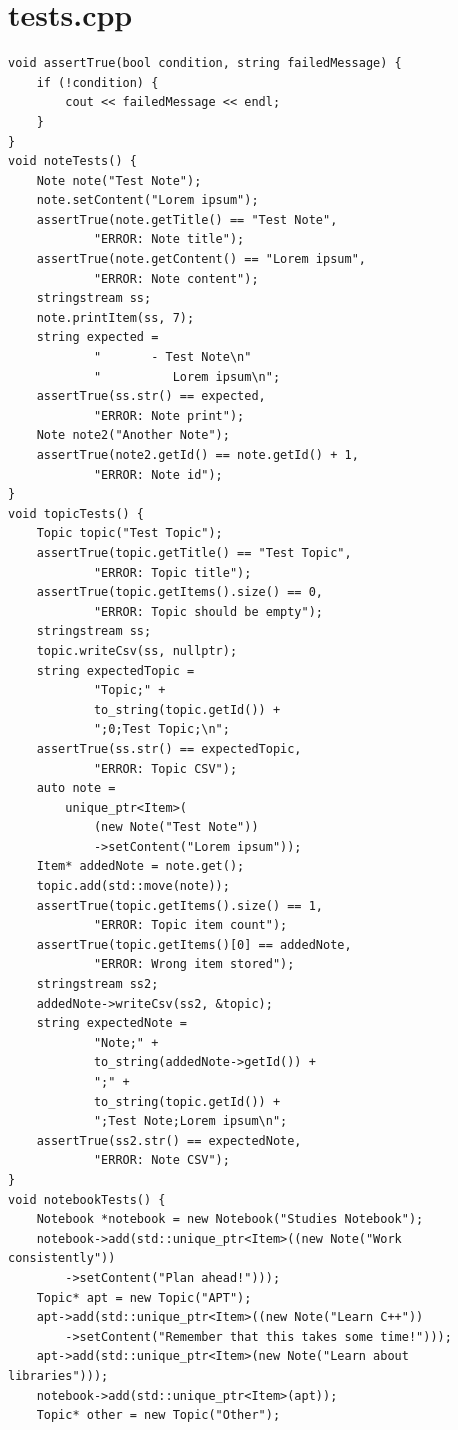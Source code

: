 \documentclass[8pt,twocolumn]{extarticle}
\begin{document}
\section*{tests.cpp}
\begin{lstlisting}
void assertTrue(bool condition, string failedMessage) {
    if (!condition) {
        cout << failedMessage << endl;
    }
}
void noteTests() {
    Note note("Test Note");
    note.setContent("Lorem ipsum");
    assertTrue(note.getTitle() == "Test Note",
            "ERROR: Note title");
    assertTrue(note.getContent() == "Lorem ipsum",
            "ERROR: Note content");
    stringstream ss;
    note.printItem(ss, 7);
    string expected =
            "       - Test Note\n"
            "          Lorem ipsum\n";
    assertTrue(ss.str() == expected,
            "ERROR: Note print");
    Note note2("Another Note");
    assertTrue(note2.getId() == note.getId() + 1,
            "ERROR: Note id");
}
void topicTests() {
    Topic topic("Test Topic");
    assertTrue(topic.getTitle() == "Test Topic",
            "ERROR: Topic title");
    assertTrue(topic.getItems().size() == 0,
            "ERROR: Topic should be empty");
    stringstream ss;
    topic.writeCsv(ss, nullptr);
    string expectedTopic =
            "Topic;" +
            to_string(topic.getId()) +
            ";0;Test Topic;\n";
    assertTrue(ss.str() == expectedTopic,
            "ERROR: Topic CSV");
    auto note =
        unique_ptr<Item>(
            (new Note("Test Note"))
            ->setContent("Lorem ipsum"));
    Item* addedNote = note.get();
    topic.add(std::move(note));
    assertTrue(topic.getItems().size() == 1,
            "ERROR: Topic item count");
    assertTrue(topic.getItems()[0] == addedNote,
            "ERROR: Wrong item stored");
    stringstream ss2;
    addedNote->writeCsv(ss2, &topic);
    string expectedNote =
            "Note;" +
            to_string(addedNote->getId()) +
            ";" +
            to_string(topic.getId()) +
            ";Test Note;Lorem ipsum\n";
    assertTrue(ss2.str() == expectedNote,
            "ERROR: Note CSV");
}
void notebookTests() {
    Notebook *notebook = new Notebook("Studies Notebook");
    notebook->add(std::unique_ptr<Item>((new Note("Work consistently"))
        ->setContent("Plan ahead!")));
    Topic* apt = new Topic("APT");
    apt->add(std::unique_ptr<Item>((new Note("Learn C++"))
        ->setContent("Remember that this takes some time!")));
    apt->add(std::unique_ptr<Item>(new Note("Learn about libraries")));
    notebook->add(std::unique_ptr<Item>(apt));
    Topic* other = new Topic("Other");

\end{lstlisting}
\end{document}
